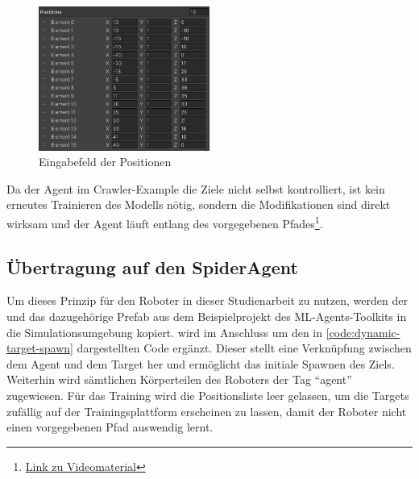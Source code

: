 \begin{figure}
    \centering
    \includegraphics[width = 0.5\textwidth]{Bilder/crawler/position-list.png}
    \caption{Eingabefeld der Positionen}
    \label{fig:eingabefeld-positionen}
\end{figure}

Da der Agent im Crawler-Example die Ziele nicht selbst kontrolliert, ist kein erneutes Trainieren des Modells nötig, sondern die Modifikationen sind direkt wirksam und der Agent läuft entlang des vorgegebenen Pfades\footnote{\href{https://github.com/yschiebelhut/studienarbeit-doc/raw/master/Videos/crawler-poc.webm}{Link zu Videomaterial}}.

\subsection{Übertragung auf den SpiderAgent}
Um dieses Prinzip für den Roboter in dieser Studienarbeit zu nutzen, werden der  und das dazugehörige Prefab aus dem Beispielprojekt des ML-Agents-Toolkits in die Simulationsumgebung kopiert.
 wird im Anschluss um den in \autoref{code:dynamic-target-spawn} dargestellten Code ergänzt.
Dieser stellt eine Verknüpfung zwischen dem Agent und dem Target her und ermöglicht das initiale Spawnen des Ziels.
Weiterhin wird sämtlichen Körperteilen des Roboters der Tag \enquote{agent} zugewiesen.
Für das Training wird die Positionsliste leer gelassen, um die Targets zufällig auf der Trainingsplattform erscheinen zu lassen, damit der Roboter nicht einen vorgegebenen Pfad auswendig lernt.


\begin{figure}
    
\end{figure}

